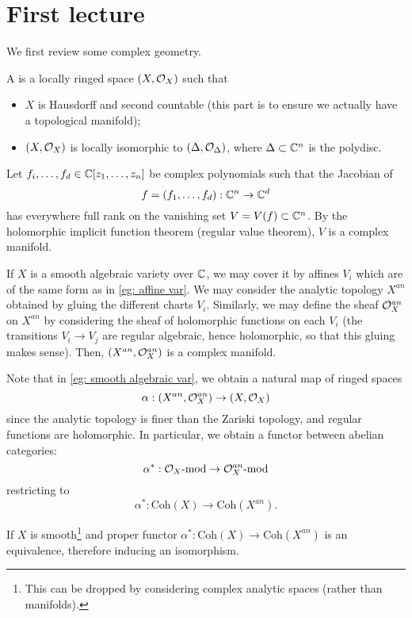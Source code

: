 \section{First lecture}
We first review some complex geometry.
\begin{definition}
	A  is a locally ringed space $(X,\mathcal{O}_X)$ such that
	\begin{itemize}
		\item $X$ is Hausdorff and second countable (this part is to ensure we actually have a topological manifold);
		\item $(X,\mathcal{O}_X)$ is locally isomorphic to $(\Delta,\mathcal{O}_\Delta)$, where $\Delta\subset \mathbb C^n$ is the polydisc.\qedbarhere 
	\end{itemize} 
\end{definition}
\begin{example}\label{eg: affine var}
	Let $f_i,\dots,f_d\in\mathbb C[z_1,\dots,z_n]$ be complex polynomials such that the Jacobian of
	\[f=(f_1,\dots,f_d):\mathbb C^n\to \mathbb C^d
	\]
	has everywhere full rank on the vanishing set $V=V(f)\subset \mathbb C^n$. By the holomorphic implicit function theorem (regular value theorem), $V$ is a complex manifold.
\end{example}
\begin{example}\label{eg: smooth algebraic var}
	If $X$ is a smooth algebraic variety over $\mathbb C$, we may cover it by affines $V_i$ which are of the same form as in \autoref{eg: affine var}. We may consider the analytic topology $X^{an}$ obtained by gluing the different charts $V_i$. Similarly, we may define the sheaf $\mathcal{O}_X^{an}$ on $X^{an}$ by considering the sheaf of holomorphic functions on each $V_i$ (the transitions $V_i\to V_j$ are regular algebraic, hence holomorphic, so that this gluing makes sense). Then, $(X^{an},\mathcal{O}_X^{an})$ is a complex manifold.
\end{example}

Note that in \autoref{eg: smooth algebraic var}, we obtain a natural map of ringed spaces
%
\[
\alpha:(X^{an},\mathcal{O}_X^{an})\to (X,\mathcal{O}_X)
\]
since the analytic topology is finer than the Zariski topology, and regular functions are holomorphic. In particular, we obtain a functor between abelian categories:
\[
\alpha^*:\mathcal{O}_X\text{-mod}\to \mathcal{O}_X^{an}\text{-mod}
\]
restricting to
\[
\alpha^*:\text{Coh}(X)\to \text{Coh}(X^{an}).
\]
\begin{theorem}
	If $X$ is smooth\footnote{This can be dropped by considering complex analytic spaces (rather than manifolds).} and proper functor $\alpha^*:\text{Coh}(X)\to\text{Coh}(X^{an})$ is an equivalence, therefore inducing an isomorphism.
\end{theorem}
